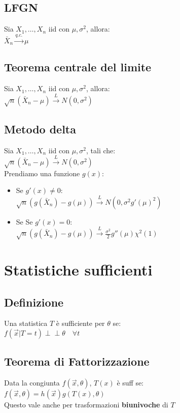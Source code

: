 \documentclass[a4paper,notitlepage]{report}%
\newcommand{\indep}{\perp \!\!\! \perp} %
\begin{document}
\begin{multicols*}{2}
    \subsection*{LFGN}
    Sia $X_1, \dots, X_n$ iid con $\mu, \sigma^2$, allora:\\
    $\bar{X}_n \overset{q.c.}{\to} \mu$


    \subsection*{Teorema centrale del limite}
    Sia $X_1, \dots, X_n$ iid con $\mu, \sigma^2$, allora:\\
    $\sqrt{n}(\bar{X}_n - \mu) \overset{L}{\to} N(0,\sigma^2)$


    \subsection*{Metodo delta}
    Sia $X_1, \dots, X_n$ iid con $\mu, \sigma^2$, tali che:\\
    $\sqrt{n}(\bar{X}_n - \mu) \overset{L}{\to} N(0,\sigma^2)$ \\
    Prendiamo una funzione $g(x)$:
    \begin{itemize}
        \item Se $g'(x)\neq0$: \\
            $\sqrt{n}(g(\bar{X}_n) - g(\mu)) \overset{L}{\to} N(0,\sigma^2g'(\mu)^2)$
        \item Se Se $g'(x)=0$: \\
        $\sqrt{n}(g(\bar{X}_n) - g(\mu)) \overset{L}{\to} \frac{\sigma^2}{2} g''(\mu)\chi^2(1)$
    \end{itemize}


\section*{Statistiche sufficienti}


    \subsection*{Definizione}
    Una statistica $T$ è sufficiente per $\theta$ se:\\
    $f(\vec{x}|T=t) \indep \theta \quad \forall t$


    \subsection*{Teorema di Fattorizzazione}
    Data la congiunta $f(\vec{x},\theta)$, $T(x)$ è suff se:\\
    $f(\vec{x},\theta) = h(\vec{x}) g(T(x),\theta)$\\
    Questo vale anche per trasformazioni \textbf{biunivoche} di $T$



\end{multicols*}
\end{document}
